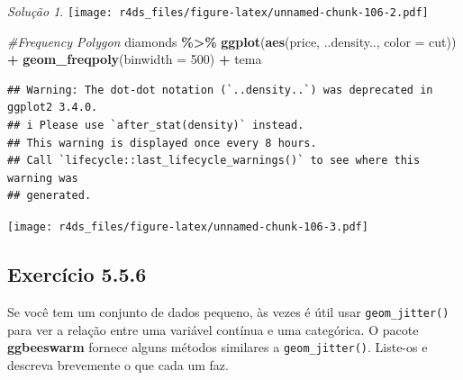 \documentclass[
]{latex/krantz}
\newenvironment{Shaded}{\begin{snugshade}}{\end{snugshade}}
\newcommand{\AttributeTok}[1]{\textcolor[rgb]{0.13,0.29,0.53}{#1}}
\newcommand{\CommentTok}[1]{\textcolor[rgb]{0.56,0.35,0.01}{\textit{#1}}}
\newcommand{\DecValTok}[1]{\textcolor[rgb]{0.00,0.00,0.81}{#1}}
\newcommand{\FunctionTok}[1]{\textcolor[rgb]{0.13,0.29,0.53}{\textbf{#1}}}
\newcommand{\NormalTok}[1]{#1}
\newcommand{\SpecialCharTok}[1]{\textcolor[rgb]{0.81,0.36,0.00}{\textbf{#1}}}
\theoremstyle{definition}
\theoremstyle{definition}
\theoremstyle{definition}
\theoremstyle{definition}
\theoremstyle{remark}
\newtheorem*{solution}{Solução}
\begin{document}
\begin{solution}
\texttt{[image: r4ds\_files/figure-latex/unnamed-chunk-106-2.pdf]}

\begin{Shaded}
\begin{Highlighting}[]
\CommentTok{\#Frequency Polygon}
\NormalTok{diamonds }\SpecialCharTok{\%\textgreater{}\%}
    \FunctionTok{ggplot}\NormalTok{(}\FunctionTok{aes}\NormalTok{(price, ..density.., }\AttributeTok{color =}\NormalTok{ cut)) }\SpecialCharTok{+}
    \FunctionTok{geom\_freqpoly}\NormalTok{(}\AttributeTok{binwidth =} \DecValTok{500}\NormalTok{) }\SpecialCharTok{+}
\NormalTok{    tema}
\end{Highlighting}
\end{Shaded}

\begin{verbatim}
## Warning: The dot-dot notation (`..density..`) was deprecated in ggplot2 3.4.0.
## i Please use `after_stat(density)` instead.
## This warning is displayed once every 8 hours.
## Call `lifecycle::last_lifecycle_warnings()` to see where this warning was
## generated.
\end{verbatim}

\texttt{[image: r4ds\_files/figure-latex/unnamed-chunk-106-3.pdf]}
\end{solution}

\hypertarget{exr5-5-6}{%
\subsection*{Exercício 5.5.6}\label{exr5-5-6}}

Se você tem um conjunto de dados pequeno, às vezes é útil usar \texttt{geom\_jitter()} para ver a relação entre uma variável contínua e uma categórica. O pacote \textbf{ggbeeswarm} fornece alguns métodos similares a \texttt{geom\_jitter()}. Liste-os e descreva brevemente o que cada um faz.
\end{document}
